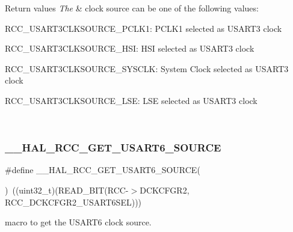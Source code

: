 \begin{DoxyRetVals}{Return values}
{\em The} & clock source can be one of the following values\+: \begin{DoxyItemize}
\item R\+C\+C\+\_\+\+U\+S\+A\+R\+T3\+C\+L\+K\+S\+O\+U\+R\+C\+E\+\_\+\+P\+C\+L\+K1\+: P\+C\+L\+K1 selected as U\+S\+A\+R\+T3 clock \item R\+C\+C\+\_\+\+U\+S\+A\+R\+T3\+C\+L\+K\+S\+O\+U\+R\+C\+E\+\_\+\+H\+SI\+: H\+SI selected as U\+S\+A\+R\+T3 clock \item R\+C\+C\+\_\+\+U\+S\+A\+R\+T3\+C\+L\+K\+S\+O\+U\+R\+C\+E\+\_\+\+S\+Y\+S\+C\+LK\+: System Clock selected as U\+S\+A\+R\+T3 clock \item R\+C\+C\+\_\+\+U\+S\+A\+R\+T3\+C\+L\+K\+S\+O\+U\+R\+C\+E\+\_\+\+L\+SE\+: L\+SE selected as U\+S\+A\+R\+T3 clock \end{DoxyItemize}
\\
\hline
\end{DoxyRetVals}
\mbox{\label{group___r_c_c_ex___exported___macros_ga544fa1b282526a1e12562e35bea55d13}} 
\subsubsection{\texorpdfstring{\_\_HAL\_RCC\_GET\_USART6\_SOURCE}{\_\_HAL\_RCC\_GET\_USART6\_SOURCE}}
{\footnotesize\ttfamily \#define \+\_\+\+\_\+\+H\+A\+L\+\_\+\+R\+C\+C\+\_\+\+G\+E\+T\+\_\+\+U\+S\+A\+R\+T6\+\_\+\+S\+O\+U\+R\+CE(\begin{DoxyParamCaption}{ }\end{DoxyParamCaption})~((uint32\+\_\+t)(R\+E\+A\+D\+\_\+\+B\+IT(R\+CC-\/$>$D\+C\+K\+C\+F\+G\+R2, R\+C\+C\+\_\+\+D\+C\+K\+C\+F\+G\+R2\+\_\+\+U\+S\+A\+R\+T6\+S\+EL)))}



macro to get the U\+S\+A\+R\+T6 clock source. 


